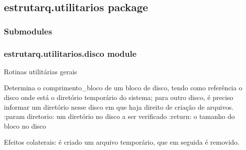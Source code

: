 \documentclass[letterpaper,10pt,brazil]{sphinxmanual}
\begin{document}
\subsection{estrutarq.utilitarios package}
\label{\detokenize{estrutarq.utilitarios:estrutarq-utilitarios-package}}\label{\detokenize{estrutarq.utilitarios::doc}}

\subsubsection{Submodules}
\label{\detokenize{estrutarq.utilitarios:submodules}}

\subsubsection{estrutarq.utilitarios.disco module}
\label{\detokenize{estrutarq.utilitarios:module-estrutarq.utilitarios.disco}}\label{\detokenize{estrutarq.utilitarios:estrutarq-utilitarios-disco-module}}
\sphinxAtStartPar
Rotinas utilitárias gerais

\begin{fulllineitems}
\label{\detokenize{estrutarq.utilitarios:estrutarq.utilitarios.disco.comprimento_de_bloco}}
\pysigstartsignatures
{}
\pysigstopsignatures
\sphinxAtStartPar
Determina o comprimento\_bloco de um bloco de disco, tendo como referência
o disco onde está o diretório temporário do sistema; para outro
disco, é preciso informar um diretório nesse disco em que haja direito
de criação de arquivos.
:param diretorio: um diretório no disco a ser verificado
:return: o tamanho do bloco no disco

\sphinxAtStartPar
Efeitos colaterais: é criado um arquivo temporário, que em seguida
é removido.

\end{fulllineitems}
\end{document}
